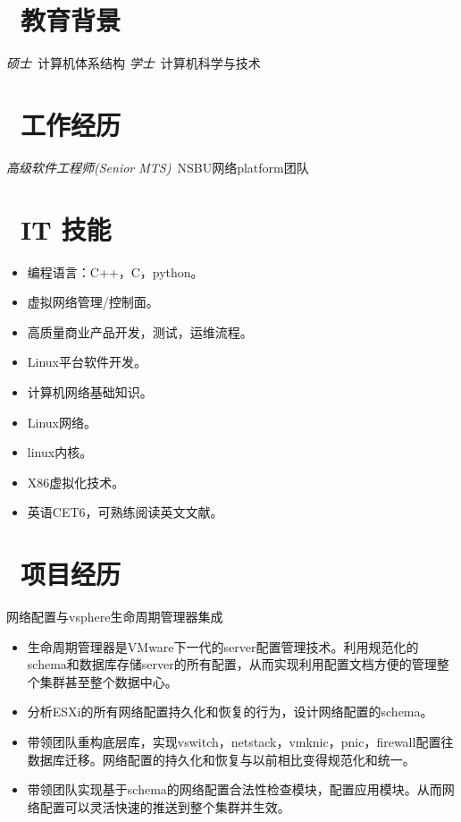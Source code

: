 \documentclass{resume}
\begin{document}


 
\section{\faGraduationCap\  教育背景}
\textit{硕士}\ 计算机体系结构
\textit{学士}\ 计算机科学与技术

\section{\faWrench\  工作经历}
\textit{高级软件工程师(Senior MTS)}\  NSBU网络platform团队

\section{\faCogs\ IT 技能}
\begin{itemize}[parsep=0.5ex]
  \item 编程语言：C++，C，python。
  \item 虚拟网络管理/控制面。
  \item 高质量商业产品开发，测试，运维流程。
  \item Linux平台软件开发。
  \item 计算机网络基础知识。
  \item Linux网络。
  \item linux内核。
  \item X86虚拟化技术。
  \item 英语CET6，可熟练阅读英文文献。
\end{itemize}

\section{\faUsers\ 项目经历}
网络配置与vsphere生命周期管理器集成
\begin{itemize}
  \item 生命周期管理器是VMware下一代的server配置管理技术。利用规范化的schema和数据库存储server的所有配置，从而实现利用配置文档方便的管理整个集群甚至整个数据中心。
  \item 分析ESXi的所有网络配置持久化和恢复的行为，设计网络配置的schema。
  \item 带领团队重构底层库，实现vswitch，netstack，vmknic，pnic，firewall配置往数据库迁移。网络配置的持久化和恢复与以前相比变得规范化和统一。
  \item 带领团队实现基于schema的网络配置合法性检查模块，配置应用模块。从而网络配置可以灵活快速的推送到整个集群并生效。
\end{itemize}
\end{document}
